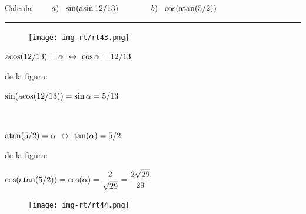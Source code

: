 \begin{miejercicio}

Calcula $\qquad a)\ \ \sin(\asin 12/13) \qquad \qquad b)\ \ 	\cos (\atan(5/2))$

\rule{250pt}{0.1pt}

\begin{multicols}{2}
\begin{figure}[H]
	\centering
	\texttt{[image: img-rt/rt43.png]}
\end{figure}

	\vspace{2mm} $\acos (12/13)=\alpha \ \leftrightarrow \ \cos \alpha=12/13$
	
	\vspace{2mm} de la figura: 
	
	\vspace{2mm} $\sin(\acos(12/13))=\sin \alpha= 5/13$	
\end{multicols}

\begin{multicols}{2}
$\quad$

\vspace{4mm}$\atan(5/2)= \alpha \ \leftrightarrow \ \tan(\alpha)=5/2$

\vspace{2mm}de la figura:

\vspace{2mm}$\cos(\atan(5/2))=\cos(\alpha)=\dfrac 2{\sqrt{29}}=\dfrac{2\sqrt{29}}{29}$
\begin{figure}[H]
	\centering
	\texttt{[image: img-rt/rt44.png]}
\end{figure}
\end{multicols}	
\end{miejercicio}


